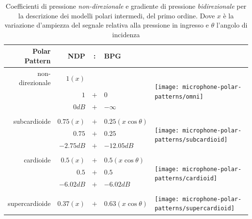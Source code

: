 \begin{refsection}
\begin{table}[ht]
\caption[]{Coefficienti di pressione \emph{non-direzionale} e gradiente di pressione
\emph{bidirezionale} per la descrizione dei modelli polari intermedi, del primo ordine.
Dove $x$ è la variazione d'ampiezza del segnale relativa alla pressione in
ingresso e $\theta$ l'angolo di incidenza}
\begin{center}
\begin{tabular}{rrcll}
\textbf{Polar Pattern} & \textbf{NDP} & : & \textbf{BPG} &\\
\hline
non-direzionale & $1(x)$       &     &                      &
 \multirow{4}{*}{\begin{minipage}{.25\textwidth}\texttt{[image: microphone-polar-patterns/omni]}\end{minipage}} \\
                & $1$          & $+$ & $0$                  & \\
                & $0dB$        & $+$ & $-\infty$         & \\ %
& \\
\hline
subcardioide    & $0.75(x)$    & $+$ & $0.25(x\cos\theta)$  &
 \multirow{4}{*}{\begin{minipage}{.25\textwidth}\texttt{[image: microphone-polar-patterns/subcardioid]}\end{minipage}} \\
                & $0.75$       & $+$ & $0.25$               & \\
                & $-2.75dB$    & $+$ & $-12.05dB$           & \\
& \\
\hline
cardioide       & $0.5(x)$     & $+$ & $0.5(x\cos\theta)$   &
 \multirow{4}{*}{\begin{minipage}{.25\textwidth}\texttt{[image: microphone-polar-patterns/cardioid]}\end{minipage}} \\
                & $0.5$        & $+$ & $0.5$                & \\
                & $-6.02dB$    & $+$ & $-6.02dB$            & \\ %
& \\
\hline
supercardioide  & $0.37(x)$    & $+$ & $0.63(x\cos\theta)$  &
 \multirow{4}{*}{\begin{minipage}{.25\textwidth}\texttt{[image: microphone-polar-patterns/supercardioid]}\end{minipage}} \\

\end{tabular}
\end{center}
\end{table}
\end{refsection}
